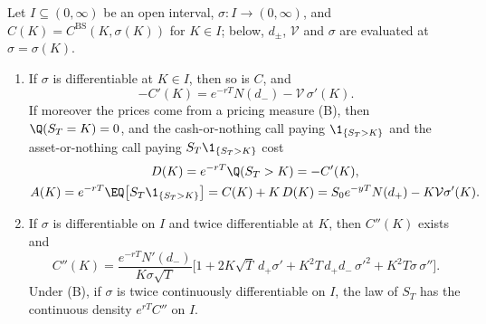 \begin{proposition}\label{prop:sk-binary-smile}
Let $I\subseteq(0,\infty)$ be an open interval, $\sigma:I\to(0,\infty)$, and $C(K)=C^{\mathrm{BS}}(K,\sigma(K))$
for $K\in I$; below, $d_\pm$, $\mathcal V$ and $\sigma$ are evaluated at $\sigma=\sigma(K)$.
\begin{enumerate}[label=(\roman*)]
  \item If $\sigma$ is differentiable at $K\in I$, then so is $C$, and
    \begin{equation}\label{eq:sk-skew-term}
      -C'(K)=e^{-rT}N(d_-)-\mathcal V\,\sigma'(K).
    \end{equation}
    If moreover the prices come from a pricing measure (B), then $\Q(S_T=K)=0$, and the cash-or-nothing
    call paying $\1_{\{S_T>K\}}$ and the asset-or-nothing call paying $S_T\1_{\{S_T>K\}}$ cost
    \begin{gather*}
      D(K)=e^{-rT}\Q(S_T>K)=-C'(K),\\
      A(K)=e^{-rT}\EQ\big[S_T\1_{\{S_T>K\}}\big]=C(K)+K\,D(K)=S_0e^{-yT}N(d_+)-K\mathcal V\sigma'(K).
    \end{gather*}
  \item If $\sigma$ is differentiable on $I$ and twice differentiable at $K$, then $C''(K)$ exists and
    \begin{equation}\label{eq:sk-smile-density}
      C''(K)=\frac{e^{-rT}N'(d_-)}{K\sigma\sqrt T}\Big[1+2K\sqrt T\,d_+\sigma'+K^2T\,d_+d_-\,\sigma'^2+K^2T\sigma\,\sigma''\Big].
    \end{equation}
    Under (B), if $\sigma$ is twice continuously differentiable on $I$, the law of $S_T$ has the
    continuous density $e^{rT}C''$ on $I$.
\end{enumerate}
\end{proposition}


